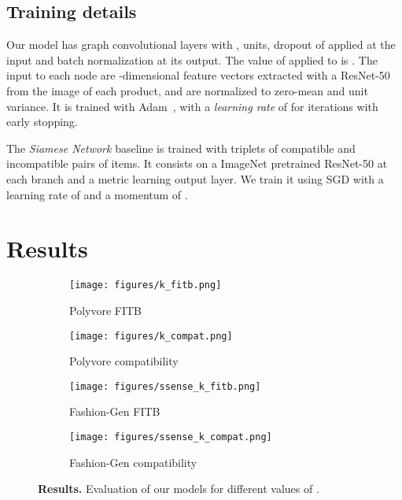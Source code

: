 \documentclass[10pt,twocolumn,letterpaper]{article}
\begin{document}
\subsection{Training details}
\label{ssec:training_details}
Our model has  graph convolutional layers with ,  units, dropout of  applied at the input and batch normalization at its output. The value of  applied to  is . 
The input to each node are -dimensional feature vectors extracted with a ResNet-50~\cite{he2016deep} from the image of each product, and are normalized to zero-mean and unit variance. It is trained with Adam~\cite{kingma2014adam}, with a \textit{learning rate} of  for  iterations with early stopping.

The \emph{Siamese Network} baseline is trained with triplets of compatible and incompatible pairs of items. It consists on a ImageNet pretrained ResNet-50 at each branch and a metric learning output layer. We train it using SGD with a learning rate of  and a momentum of .


\section{Results}
\label{sec:results}



\begin{figure*}[t]
\begin{center}
\begin{subfigure}{.24\textwidth}
  \centering
  \texttt{[image: figures/k\_fitb.png]}
  \caption{Polyvore FITB}
  \label{fig:k_fitb_poly}
\end{subfigure}\begin{subfigure}{.245\textwidth}
  \centering
  \texttt{[image: figures/k\_compat.png]}
  \caption{Polyvore compatibility}
  \label{fig:k_compat_poly}
\end{subfigure}\begin{subfigure}{.24\textwidth}
  \centering
  \texttt{[image: figures/ssense\_k\_fitb.png]}
  \caption{Fashion-Gen FITB}
  \label{fig:k_fitb_ssense}
\end{subfigure}\begin{subfigure}{.245\textwidth}
  \centering
  \texttt{[image: figures/ssense\_k\_compat.png]}
  \caption{Fashion-Gen compatibility}
  \label{fig:k_compat_ssense}
\end{subfigure}
\end{center}
\caption{\textbf{Results.} Evaluation of our models for different values of .}
\label{fig:k}
\end{figure*}
\end{document}
